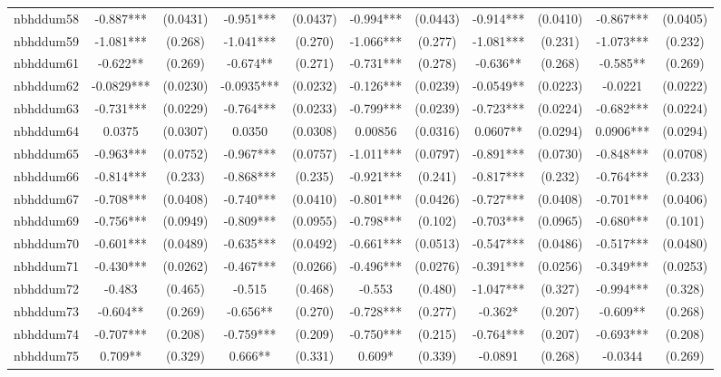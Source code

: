 \documentclass[]{article}
\begin{document}
\begin{tabular}{lcccccccccc}
nbhddum58 & -0.887*** & (0.0431) & -0.951*** & (0.0437) & -0.994*** & (0.0443) & -0.914*** & (0.0410) & -0.867*** & (0.0405) \\
nbhddum59 & -1.081*** & (0.268) & -1.041*** & (0.270) & -1.066*** & (0.277) & -1.081*** & (0.231) & -1.073*** & (0.232) \\
nbhddum61 & -0.622** & (0.269) & -0.674** & (0.271) & -0.731*** & (0.278) & -0.636** & (0.268) & -0.585** & (0.269) \\
nbhddum62 & -0.0829*** & (0.0230) & -0.0935*** & (0.0232) & -0.126*** & (0.0239) & -0.0549** & (0.0223) & -0.0221 & (0.0222) \\
nbhddum63 & -0.731*** & (0.0229) & -0.764*** & (0.0233) & -0.799*** & (0.0239) & -0.723*** & (0.0224) & -0.682*** & (0.0224) \\
nbhddum64 & 0.0375 & (0.0307) & 0.0350 & (0.0308) & 0.00856 & (0.0316) & 0.0607** & (0.0294) & 0.0906*** & (0.0294) \\
nbhddum65 & -0.963*** & (0.0752) & -0.967*** & (0.0757) & -1.011*** & (0.0797) & -0.891*** & (0.0730) & -0.848*** & (0.0708) \\
nbhddum66 & -0.814*** & (0.233) & -0.868*** & (0.235) & -0.921*** & (0.241) & -0.817*** & (0.232) & -0.764*** & (0.233) \\
nbhddum67 & -0.708*** & (0.0408) & -0.740*** & (0.0410) & -0.801*** & (0.0426) & -0.727*** & (0.0408) & -0.701*** & (0.0406) \\
nbhddum69 & -0.756*** & (0.0949) & -0.809*** & (0.0955) & -0.798*** & (0.102) & -0.703*** & (0.0965) & -0.680*** & (0.101) \\
nbhddum70 & -0.601*** & (0.0489) & -0.635*** & (0.0492) & -0.661*** & (0.0513) & -0.547*** & (0.0486) & -0.517*** & (0.0480) \\
nbhddum71 & -0.430*** & (0.0262) & -0.467*** & (0.0266) & -0.496*** & (0.0276) & -0.391*** & (0.0256) & -0.349*** & (0.0253) \\
nbhddum72 & -0.483 & (0.465) & -0.515 & (0.468) & -0.553 & (0.480) & -1.047*** & (0.327) & -0.994*** & (0.328) \\
nbhddum73 & -0.604** & (0.269) & -0.656** & (0.270) & -0.728*** & (0.277) & -0.362* & (0.207) & -0.609** & (0.268) \\
nbhddum74 & -0.707*** & (0.208) & -0.759*** & (0.209) & -0.750*** & (0.215) & -0.764*** & (0.207) & -0.693*** & (0.208) \\
nbhddum75 & 0.709** & (0.329) & 0.666** & (0.331) & 0.609* & (0.339) & -0.0891 & (0.268) & -0.0344 & (0.269) \\

\end{tabular}
\end{document}
